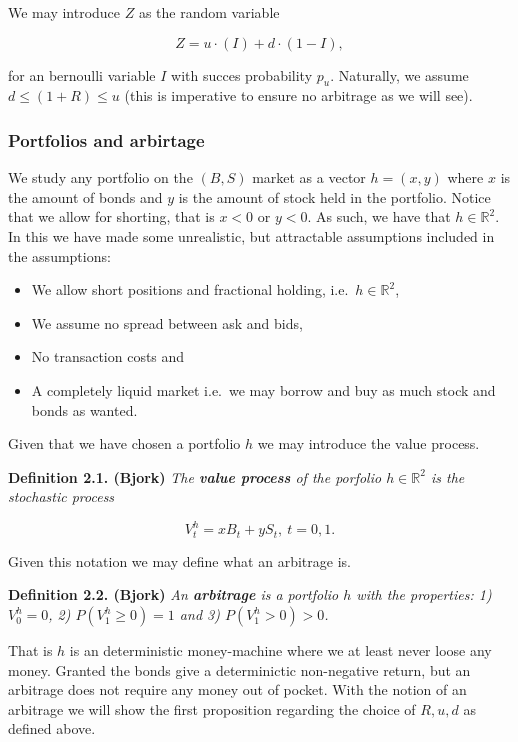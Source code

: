 \documentclass[a4paper,10pt,openany]{book}
\providecommand{\tightlist}{%
 \setlength{\itemsep}{0pt}\setlength{\parskip}{0pt}}
\begin{document}
We may introduce \(Z\) as the random variable

\[
Z=u\cdot (I)+d\cdot (1-I),
\]

for an bernoulli variable \(I\) with succes probability \(p_u\). Naturally, we assume \(d\le (1+R)\le u\) (this is imperative to ensure no arbitrage as we will see).

\hypertarget{portfolios-and-arbirtage}{%
\subsubsection{Portfolios and arbirtage}\label{portfolios-and-arbirtage}}

We study any portfolio on the \((B,S)\) market as a vector \(h=(x,y)\) where \(x\) is the amount of bonds and \(y\) is the amount of stock held in the portfolio. Notice that we allow for shorting, that is \(x<0\) or \(y<0\). As such, we have that \(h\in \mathbb{R}^2\). In this we have made some unrealistic, but attractable assumptions included in the assumptions:

\begin{itemize}
\tightlist
\item
  We allow short positions and fractional holding, i.e.~\(h\in \mathbb{R}^2\),
\item
  We assume no spread between ask and bids,
\item
  No transaction costs and
\item
  A completely liquid market i.e.~we may borrow and buy as much stock and bonds as wanted.
\end{itemize}

Given that we have chosen a portfolio \(h\) we may introduce the value process.

\textbf{Definition 2.1. (Bjork)} \emph{The \textbf{value process} of the porfolio \(h\in\mathbb{R}^2\) is the stochastic process}

\[
V^h_t=xB_t+yS_t,\ t=0,1.
\]

Given this notation we may define what an arbitrage is.

\textbf{Definition 2.2. (Bjork)} \emph{An \textbf{arbitrage} is a portfolio \(h\) with the properties: 1) \(V^h_0=0\), 2) \(P(V^h_1\ge 0)=1\) and 3) \(P(V^h_1>0)>0\).}

That is \(h\) is an deterministic money-machine where we at least never loose any money. Granted the bonds give a determinictic non-negative return, but an arbitrage does not require any money out of pocket. With the notion of an arbitrage we will show the first proposition regarding the choice of \(R,u,d\) as defined above.
\end{document}
